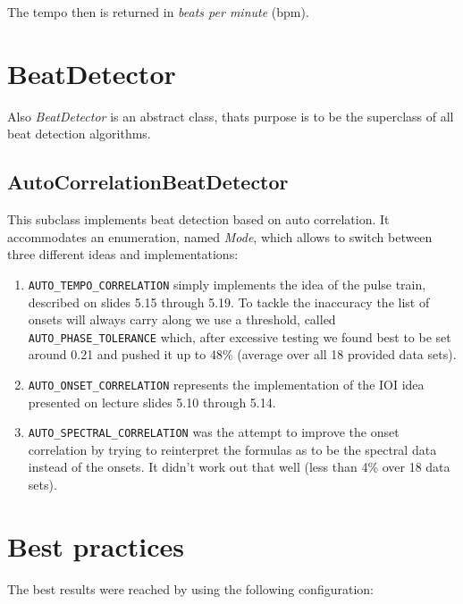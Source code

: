 The tempo then is returned in \emph{beats per minute} (bpm).

\section{\ttfamily BeatDetector} \label{sec:beat}
Also \emph{BeatDetector} is an abstract class, thats purpose is to be the
superclass of all beat detection algorithms. 

\subsection{\ttfamily AutoCorrelationBeatDetector} \label{ssec:beatauto}
This subclass implements beat detection based on auto correlation. It
accommodates an enumeration, named \emph{Mode}, which allows to switch between
three different ideas and implementations:

\begin{enumerate}
  \item \texttt{AUTO\_TEMPO\_CORRELATION} simply implements the idea of the
  pulse train, described on slides 5.15 through 5.19. To tackle the inaccuracy the
  list of onsets will always carry along we use a threshold, called
  \texttt{AUTO\_PHASE\_TOLERANCE} which, after excessive testing we found best
  to be set around 0.21 and pushed it up to 48\% (average over all 18 provided data
  sets).
  \item \texttt{AUTO\_ONSET\_CORRELATION} represents the implementation of the
  IOI idea presented on lecture slides 5.10 through 5.14.
  \item \texttt{AUTO\_SPECTRAL\_CORRELATION} was the attempt to improve the
  onset correlation by trying to reinterpret the formulas as to be the spectral data
  instead of the onsets. It didn't work out that well (less than 4\% over 18
  data sets).
\end{enumerate}

\section{Best practices} \label{sec:bestresults}
The best results were reached by using the following configuration:

